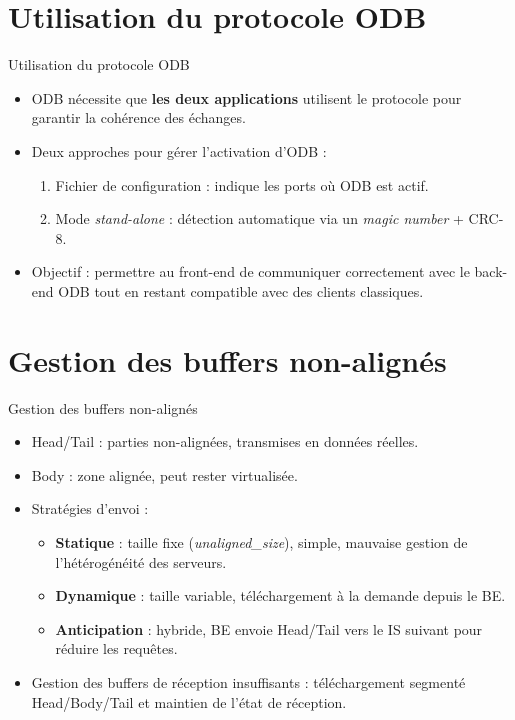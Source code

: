 \documentclass[aspectratio=43,8pt]{beamer}
\begin{document}
\section{Utilisation du protocole ODB}
\begin{frame}{Utilisation du protocole ODB}
\begin{card}
    \begin{itemize}
        \item ODB nécessite que \textbf{les deux applications} utilisent le protocole pour garantir la cohérence des échanges.
        \item Deux approches pour gérer l’activation d’ODB :
        \begin{enumerate}
            \item Fichier de configuration : indique les ports où ODB est actif.
            \item Mode \emph{stand-alone} : détection automatique via un \emph{magic number} + CRC-8.
        \end{enumerate}
        \item Objectif : permettre au front-end de communiquer correctement avec le back-end ODB tout en restant compatible avec des clients classiques.
    \end{itemize}
    \end{card}
\end{frame}

\section{Gestion des buffers non-alignés}
\begin{frame}{Gestion des buffers non-alignés}
\begin{card}
    \begin{itemize}
        \item Head/Tail : parties non-alignées, transmises en données réelles.
        \item Body : zone alignée, peut rester virtualisée.
        \item Stratégies d’envoi :
        \begin{itemize}
            \item \textbf{Statique} : taille fixe (\emph{unaligned\_size}), simple, mauvaise gestion de l’hétérogénéité des serveurs.
            \item \textbf{Dynamique} : taille variable, téléchargement à la demande depuis le BE.
            \item \textbf{Anticipation} : hybride, BE envoie Head/Tail vers le IS suivant pour réduire les requêtes.
        \end{itemize}
        \item Gestion des buffers de réception insuffisants : téléchargement segmenté Head/Body/Tail et maintien de l’état de réception.
    \end{itemize}
\end{card}
\end{frame}
\end{document}

